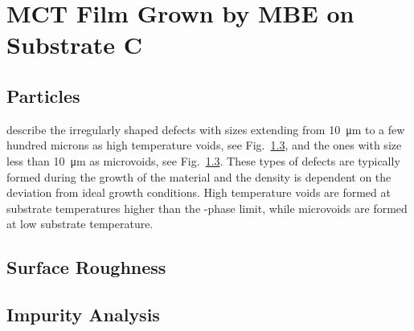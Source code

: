 \clearpage
\section{MCT Film Grown by MBE on  Substrate C}\label{sec:subCc}

\subsection{Particles}

\citet{selvig2007defects} describe the irregularly shaped defects with sizes extending from \SI{10}{\micro\metre} to a few hundred microns as high temperature voids, see Fig.~\ref{}, and the ones with size less than \SI{10}{\micro\metre} as microvoids, see Fig.~\ref{}. These types of defects are typically formed during the growth of the material and the density is dependent on the deviation from ideal growth conditions. High temperature voids are formed at substrate temperatures higher than the -phase limit, while microvoids are formed at low substrate temperature.

\subsection{Surface Roughness}

\subsection{Impurity Analysis}

